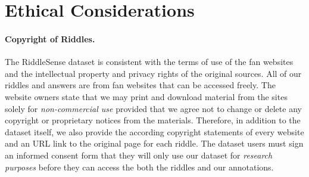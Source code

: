 \section*{{Ethical Considerations}}

\paragraph{Copyright of Riddles.} 
The RiddleSense dataset is consistent with the terms of use of the fan websites and the intellectual property and privacy rights of the original sources.
All of our riddles and answers are from fan websites that can be accessed freely.
The website owners state that we may print and download material from the sites solely for \textit{non-commercial use} provided that we agree not to change or delete any copyright or proprietary notices from the materials.
Therefore, 
in addition to the dataset itself, we also provide the according copyright statements of every website and an URL link to the original page for each riddle. 
The dataset users must sign an informed consent form that they will only use our dataset for \textit{research purposes} before they can access the both the riddles and our annotations.






 



